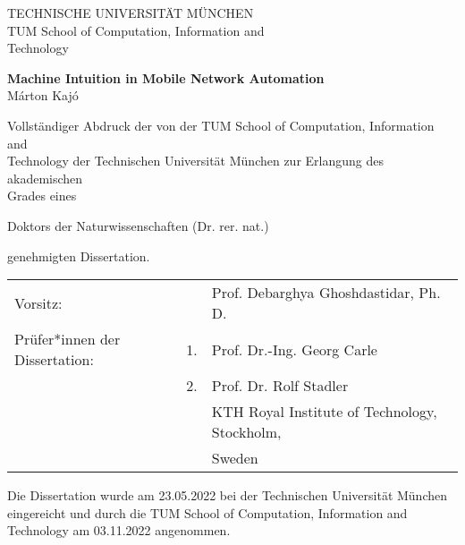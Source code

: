 

\begin{titlepage}
\setlength{\parindent}{0cm}
\begin{center}
	\large
	TECHNISCHE UNIVERSIT\"AT M\"UNCHEN\\
	TUM School of Computation, Information and\\
	Technology\\
\end{center}

\vfill

\begin{center}
	\Large
	\textbf{Machine Intuition in Mobile Network Automation}\\[1cm]
	\large
	Márton Kajó
\end{center}

\vfill

Vollst\"andiger Abdruck der von der TUM School of Computation, Information and\\
Technology der Technischen Universit\"at M\"unchen zur Erlangung des akademischen\\
Grades eines
\begin{center}
	Doktors der Naturwissenschaften (Dr. rer. nat.)
\end{center}
genehmigten Dissertation.

\begin{center}
	\setlength{\tabcolsep}{0pt}
	\begin{tabular}{p{5.5cm}p{0.7cm}p{9.0cm}}
		Vorsitz:               				&    & Prof. Debarghya Ghoshdastidar, Ph. D.\\
		Pr\"ufer*innen der Dissertation:  	& 1. & Prof. Dr.-Ing. Georg Carle\\
		                            		& 2. & Prof. Dr. Rolf Stadler\\
		                            		&    & KTH Royal Institute of Technology, Stockholm,\\
		                            		&    & Sweden	
	\end{tabular}
\end{center}

Die Dissertation wurde am 23.05.2022 bei der Technischen Universit\"at M\"unchen
eingereicht und durch die TUM School of Computation, Information and Technology am 03.11.2022 angenommen.

\vspace{1.5cm}

\end{titlepage}  
